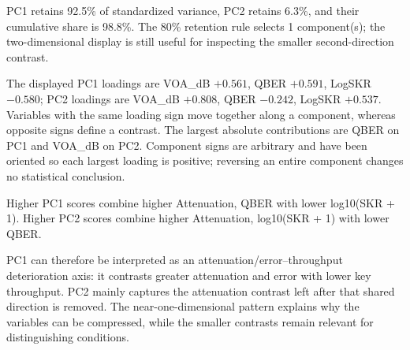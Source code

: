 PC1 retains 92.5\% of standardized variance, PC2 retains 6.3\%, and their cumulative share is 98.8\%. The 80\% retention rule selects 1 component(s); the two-dimensional display is still useful for inspecting the smaller second-direction contrast.

The displayed PC1 loadings are VOA\_dB $+0.561$, QBER $+0.591$, LogSKR $-0.580$; PC2 loadings are VOA\_dB $+0.808$, QBER $-0.242$, LogSKR $+0.537$. Variables with the same loading sign move together along a component, whereas opposite signs define a contrast. The largest absolute contributions are QBER on PC1 and VOA\_dB on PC2. Component signs are arbitrary and have been oriented so each largest loading is positive; reversing an entire component changes no statistical conclusion.

Higher PC1 scores combine higher Attenuation, QBER with lower log10(SKR + 1). Higher PC2 scores combine higher Attenuation, log10(SKR + 1) with lower QBER.


PC1 can therefore be interpreted as an attenuation/error--throughput deterioration axis: it contrasts greater attenuation and error with lower key throughput. PC2 mainly captures the attenuation contrast left after that shared direction is removed. The near-one-dimensional pattern explains why the variables can be compressed, while the smaller contrasts remain relevant for distinguishing conditions.
